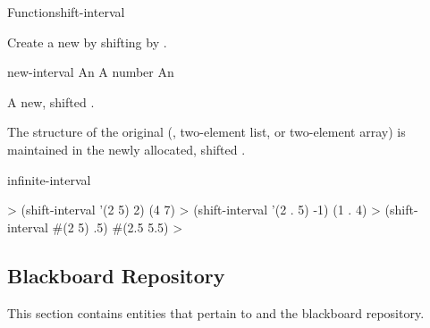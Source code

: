 \documentclass[10pt,twoside,english,pdftex]{article}
\begin{document}
\begin{functiondoc}{Function}{shift-interval}%
  {
    \returns{} }
%
%

\fnsyntax

\fnpurpose Create a new  by shifting  by
.

\fnpackage {}

\fnmodule {}

\fnargs
\begin{args}{new-interval}
\arg[interval] An 
\arg[amount] A number
 An 
\end{args}

\fnreturns A new, shifted .

\fndescription The structure of the original 
(, two-element list, or two-element array) is maintained in the
newly allocated, shifted .

\begin{alsos}{infinite-interval}
\end{alsos}

\fnexamples
%
\W\supp
\begin{example}
  > (shift-interval '(2 5) 2)
  (4 7)
  > (shift-interval '(2 . 5) -1)
  (1 . 4)
  > (shift-interval #(2 5) .5)
  #(2.5 5.5)
  >
\end{example}

\end{functiondoc}


\T\markright{}%
\T\pagestyle{plain}
\T\clearpage
\W{}
\T\pagestyle{fancy}
\T\thispagestyle{fancybottom}
\T\global\def\fnlastname{ }%

\subsection{Blackboard Repository}
\label{sec:bb-repository}%

This section contains  entities that pertain to
 and the blackboard repository.
\end{document}
